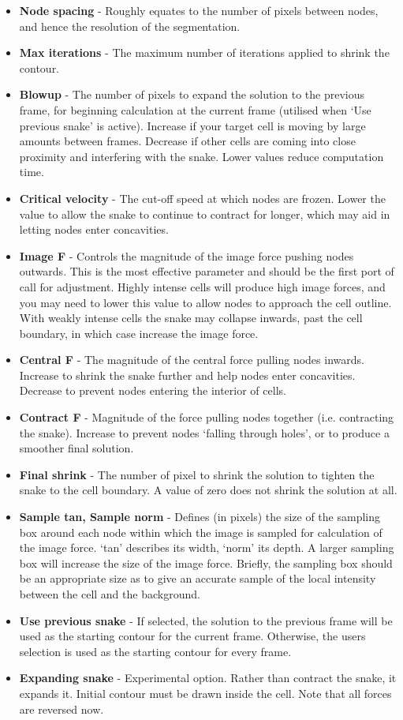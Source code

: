 \documentclass[a4paper,12pt]{article}
\begin{document}
\begin{itemize}
\item \textbf{Node spacing} - Roughly equates to the number of pixels between nodes, and hence the resolution of the segmentation.
\item \textbf{Max iterations} - The maximum number of iterations applied to shrink the contour.
\item \textbf{Blowup} - The number of pixels to expand the solution to the previous frame, for beginning 
calculation at the current frame (utilised when `Use previous snake' is active).  Increase if your target cell is moving by large 
amounts between frames.  Decrease if other cells are coming into close proximity and interfering with the snake.  Lower
values reduce computation time.
\item \textbf{Critical velocity} - The cut-off speed at which nodes are frozen.  Lower the value to allow the snake to continue 
to contract for longer, which may aid in letting nodes enter concavities.
\item \textbf{Image F} - Controls the magnitude of the image force pushing nodes outwards.  This is the most effective parameter 
and should be the first port of call for adjustment.  Highly intense cells will produce high image forces, and you may need to lower 
this value to allow nodes to approach the cell outline.  With weakly intense cells the snake may collapse inwards, past the cell 
boundary, in which case increase the image force.
\item \textbf{Central F} - The magnitude of the central force pulling nodes inwards.  Increase to shrink the snake further and help nodes enter concavities.
Decrease to prevent nodes entering the interior of cells. 
\item \textbf{Contract F} - Magnitude of the force pulling nodes together (i.e. contracting the snake).  Increase to prevent nodes `falling
through holes', or to produce a smoother final solution.
\item \textbf{Final shrink} - The number of pixel to shrink the solution to tighten the snake to the cell boundary.  A value of zero does
not shrink the solution at all.
\item \textbf{Sample tan, Sample norm} - Defines (in pixels) the size of the sampling box around each node within which the 
image is sampled for calculation of the image force.  `tan' describes its width, `norm' its depth.  A larger sampling box will increase 
the size of the image force.  Briefly, the sampling box should be an appropriate size as to give an accurate sample of the local
 intensity between the cell and the background.
\item \textbf{Use previous snake} - If selected, the solution to the previous frame will be used as the starting contour for the current frame.
Otherwise, the users selection is used as the starting contour for every frame.
\item \textbf{Expanding snake} - Experimental option. Rather than contract the snake, it expands it. Initial contour must be drawn inside the cell. Note that all forces are reversed now. 
\end{itemize}
\end{document}
